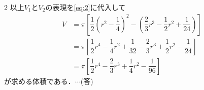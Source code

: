 \documentclass[../../main.tex]{subfiles}
\begin{document}
\begin{multicols}{2}
  以上$V_1$と$V_2$の表現を\cref{eq:2}に代入して
  \begin{align}
    V
    & = \pi \left[ \dfrac{1}{2}\left(r^2-\dfrac{1}{4}\right)^2 - \left(\dfrac{2}{3}r^3 - \dfrac{1}{2}r^2 + \dfrac{1}{24}\right) \right] \\
    & = \pi \left[ \dfrac{1}{2}r^4 - \dfrac{1}{4}r^2 + \dfrac{1}{32} - \dfrac{2}{3}r^3 + \dfrac{1}{2}r^2 - \dfrac{1}{24} \right]         \\
    & = \pi \left[ \dfrac{1}{2}r^4 - \dfrac{2}{3}r^3 + \dfrac{1}{4}r^2 - \dfrac{1}{96} \right]
  \end{align}
  が求める体積である．$\cdots$(答)


  \newpage
\end{multicols}
\end{document}
